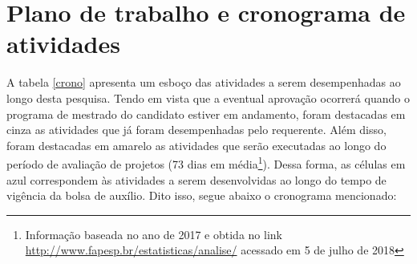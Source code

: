 \section{Plano de trabalho e cronograma de atividades}\label{cronograma}

A tabela \ref{crono} apresenta um esboço das atividades a serem desempenhadas ao longo desta pesquisa. Tendo em vista que a eventual aprovação ocorrerá quando o programa de mestrado do candidato estiver em andamento, foram destacadas em cinza as atividades que já foram desempenhadas pelo requerente. Além disso, foram destacadas em amarelo as atividades que serão executadas ao longo do período de avaliação de projetos (73 dias em média\footnote{Informação baseada no ano de 2017 e obtida no link \url{http://www.fapesp.br/estatisticas/analise/} acessado em 5 de julho de 2018}). 
Dessa forma, as células em azul correspondem às atividades a serem desenvolvidas ao longo do tempo de vigência da bolsa de auxílio. 
Dito isso, segue abaixo o cronograma mencionado:

